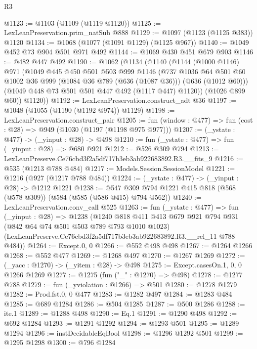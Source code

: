 \begin{lexlean}{R3}
\begin{coremodule}
@1123 := @1103 (@1109 (@1119 @1120))
@1125 := LexLeanPreservation.prim_natSub @888
@1129 := @1097 (@1123 (@1125 @383)) @1120
@1134 := @1068 (@1077 (@1091 @1129) (@1125 @967))
@1140 := @1049 @452 @73 @904 @501 @971 @492
@1144 := @1069 @430 @451 @679 @903
@1146 := @482 @447 @492
@1190 := @1062
    (@1134
      (@1140
        (@1144
          (@1000 @1146)
          @971
          (@1049
            @445
            @450
            @501
            @503
            @999
            @1146
            (@737
              @1036
              @64
              @501
              @60
              @1002
              @36
              @999
              (@1084 @36 @789 (@636 (@1087 @36)))
              (@636 (@1012 @60)))
            (@1049 @448 @73 @501 @501 @447 @492 (@1117 @447) @1120))
          (@1026 @899 @60))
        @1120))
@1192 := LexLeanPreservation.construct_adt @36
@1197 := @1048 (@1055 (@1190 (@1192 @974)) @1129)
@1198 := LexLeanPreservation.construct_pair
@1205 := fun (window : @477) => fun (cost : @28) => @949 (@1030 (@1197 (@1198 @975 @977)))
@1207 := (_ystate : @477) -> (_yinput : @28) -> @498
@1210 := fun (_ystate : @477) => fun (_yinput : @28) => @680 @921
@1212 := @526 @309 @794
@1213 := LexLeanPreserve.Ce76cbd3f2a5df717b3eb3ab922683892.R3.__fits_9
@1216 := @535 (@1213 @788 @484)
@1217 := Models.Session.SessionModel
@1221 := @1216 (@927 (@1217 @788 @484))
@1224 := (_ystate : @477) -> (_yinput : @28) -> @1212 @1221
@1238 := @547 @309 @794 @1221 @415 @818 (@568 (@578 @309)) (@584 (@585 (@586 @415) @794 @562))
@1240 := LexLeanPreservation.conv_call @525
@1263 := fun (_ystate : @477) =>
  fun (_yinput : @28) =>
  @1238
    (@1240
      @818
      @411
      @413
      @679
      @921
      @794
      @931
      (@842 @64 @74 @501 @503 @789 @793 @1010 @1023)
      (LexLeanPreserve.Ce76cbd3f2a5df717b3eb3ab922683892.R3.__rel_11 @788 @484))
@1264 := Except.{0, 0}
@1266 := @552 @498 @498
@1267 := @1264 @1266
@1268 := @552 @477
@1269 := @1268 @497
@1270 := @1267 @1269
@1272 := (_yacc : @1270) -> (_yitem : @28) -> @498
@1275 := Except.casesOn.{1, 0, 0} @1266 @1269
@1277 := @1275 (fun ("_" : @1270) => @498)
@1278 := @1277 @788
@1279 := fun (_yviolation : @1266) => @501
@1280 := @1278 @1279
@1282 := Prod.fst.{0, 0} @477
@1283 := @1282 @497
@1284 := @1283 @484
@1285 := @689 @1284
@1286 := @504 @1285
@1287 := @500 @1286
@1288 := ite.{1}
@1289 := @1288 @498
@1290 := Eq.{1}
@1291 := @1290 @498
@1292 := @692 @1284
@1293 := @1291 @1292
@1294 := @1293 @501
@1295 := @1289 @1294
@1296 := instDecidableEqBool
@1298 := @1296 @1292 @501
@1299 := @1295 @1298
@1300 := @796 @1284

\end{coremodule}
\end{lexlean}
